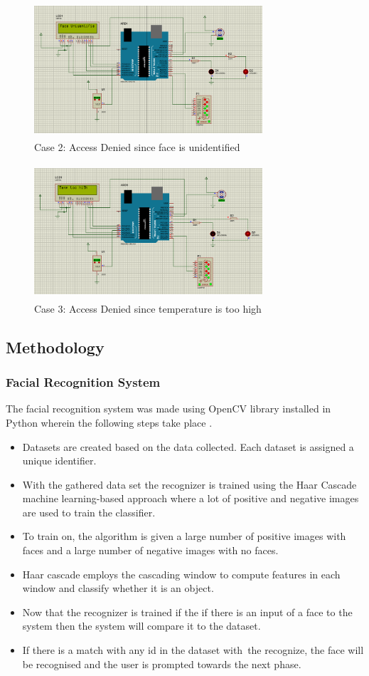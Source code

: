 \documentclass[conference]{IEEEtran}
\begin{document}
	\begin{figure}
		\centering
		\includegraphics[width=8.5cm, height=5cm]{ProtC2.png}
		\caption{\label{fig:The-caption}Case 2: Access Denied since face is unidentified}
	\end{figure}
	\begin{figure}
		\centering	\includegraphics[width=8.5cm, height=5cm]{ProtC3.png}
		\caption{\label{fig:The-caption}Case 3: Access Denied since temperature is too high}
	\end{figure}
	\subsection{Methodology}
	\subsubsection{Facial Recognition System}
	The facial recognition system was made using OpenCV library installed in Python wherein the following steps take place \cite{11}.
	\begin{itemize}
		\item Datasets are created based on the data collected. Each dataset is assigned a unique identifier.
		\item With the gathered data set the recognizer is trained using the Haar Cascade machine learning-based approach where a lot of positive and negative images are used to train the classifier.
		\item To train on, the algorithm is given a large number of positive images with faces and a large number of negative images with no faces.
		\item Haar cascade employs the cascading window to compute features in each window and classify whether it is an object.
		\item Now that the recognizer is trained if the if there is
		an input of a face to the system then the system
		will compare it to the dataset.
		\item If there is a match with any id in the dataset with the recognize, the face will be recognised and the user is prompted towards the next phase.\\
	\end{itemize}
\end{document}

